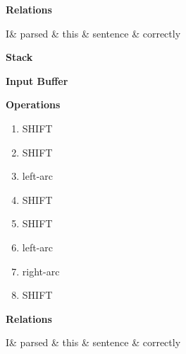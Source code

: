 \begin{center}
	\textbf{Relations}

\begin{dependency}
	\begin{deptext}[column sep=0.2cm]
		I\& parsed \& this \& sentence \& correctly \\
   \end{deptext}
\end{dependency}
\end{center}

\begin{multicols}{2}

	\textbf{Stack}

	\vspace{1cm}

	\begin{drawstack}
	\end{drawstack}
	\columnbreak
	
	\textbf{Input Buffer}
	\vspace{1cm}

	\textbf{Operations}
	\begin{enumerate}
		\item SHIFT
		\item SHIFT
		\item left-arc
		\item SHIFT
		\item SHIFT
		\item left-arc
		\item right-arc
		\item SHIFT
	\end{enumerate}
	
\end{multicols}
\begin{center}
	\textbf{Relations}

\begin{dependency}
	\begin{deptext}[column sep=0.2cm]
		I\& parsed \& this \& sentence \& correctly \\
   \end{deptext}
\end{dependency}
\end{center}

